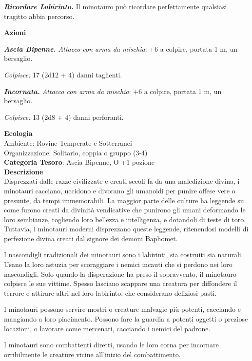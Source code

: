 \begin{multicols}{2}
{\emph{\textbf{Ricordare Labirinto.}} Il minotauro può ricordare perfettamente qualsiasi tragitto abbia percorso.

\textbf{Azioni}

\emph{\textbf{Ascia Bipenne.} Attacco con arma da mischia}: +6 a colpire, portata 1 m, un bersaglio.

\emph{Colpisce:} 17 (2d12 + 4) danni taglienti.

\emph{\textbf{Incornata.} Attacco con arma da mischia}: +6 a colpire, portata 1 m, un bersaglio.

\emph{Colpisce:} 13 (2d8 + 4) danni perforanti.

\textbf{Ecologia}\\
Ambiente: Rovine Temperate e Sotterranei\\
Organizzazione: Solitario, coppia o gruppo (3-4)\\
\textbf{Categoria Tesoro}: Ascia Bipenne, O +1 pozione\\
\textbf{Descrizione}\\
Disprezzati dalle razze civilizzate e creati secoli fa da una maledizione divina, i minotauri cacciano, uccidono e divorano gli umanoidi per punire offese vere o presunte, da tempi immemorabili. La maggior parte delle culture ha leggende su come furono creati da divinità vendicative che punirono gli umani deformando le loro sembianze, togliendo loro bellezza e intelligenza, e dotandoli di teste di toro. Tuttavia, i minotauri moderni disprezzano queste leggende, ritenendosi modelli di perfezione divina creati dal signore dei demoni Baphomet.

I nascondigli tradizionali dei minotauri sono i labirinti, sia costruiti sia naturali. Usano la loro astuzia per scoraggiare i nemici incauti che si perdono nei loro nascondigli. Solo quando la disperazione ha preso il sopravvento, il minotauro colpisce le sue vittime. Spesso lasciano scappare una creatura per diffondere il terrore e attirare altri nel loro labirinto, che considerano deliziosi pasti.

I minotauri possono servire mostri o creature malvagie più potenti, cacciando e mangiando a loro piacimento. Possono fare la guardia a potenti oggetti o preziose locazioni, o lavorare come mercenari, cacciando i nemici del padrone.

I minotauri sono combattenti diretti, usando le loro corna per incornare orribilmente le creature vicine all'inizio del combattimento.

}
\end{multicols}
